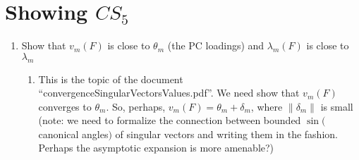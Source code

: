 \documentclass[11pt]{article}
\newcommand{\norm}[1]{\lVert #1 \rVert}
\begin{document}
\section{Showing $CS_5$}
\begin{enumerate}
\item Show that $v_m(F)$ is close to $\theta_m$ (the PC loadings) and $\lambda_m(F)$ is close to $\lambda_m$
\begin{enumerate}
\item This is the topic of the document ``convergenceSingularVectorsValues.pdf''.  We need show that $v_m(F)$ converges to $\theta_m$.  So, perhaps, $v_m(F) = \theta_m + \delta_m$,
where $\norm{\delta_m}$ is small (note: we need to formalize the connection between bounded $\sin($ canonical angles$)$ of singular vectors and writing them in the fashion.  Perhaps
the asymptotic expansion is more amenable?)

\end{enumerate}


\end{enumerate}
\end{document}
